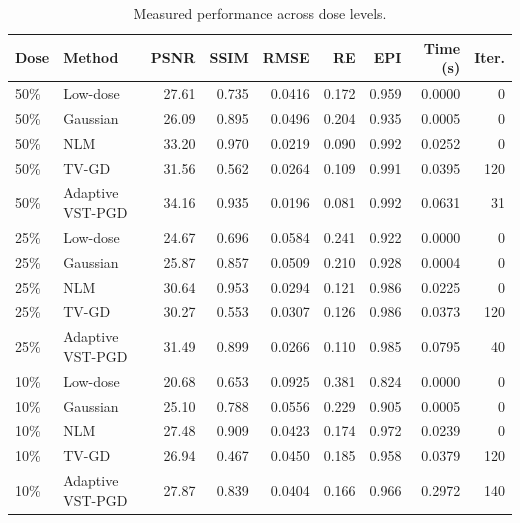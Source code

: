 \begin{table}[tbp]
\centering
\caption{Measured performance across dose levels.}
\label{tab:metrics}
\setlength{\tabcolsep}{3pt}
\begin{tabular}{@{}llrrrrrrr@{}}\toprule
Dose & Method & PSNR & SSIM & RMSE & RE & EPI & Time (s) & Iter.\\ \midrule
50\% & Low-dose & 27.61 & 0.735 & 0.0416 & 0.172 & 0.959 & 0.0000 & 0 \\
50\% & Gaussian & 26.09 & 0.895 & 0.0496 & 0.204 & 0.935 & 0.0005 & 0 \\
50\% & NLM & 33.20 & 0.970 & 0.0219 & 0.090 & 0.992 & 0.0252 & 0 \\
50\% & TV-GD & 31.56 & 0.562 & 0.0264 & 0.109 & 0.991 & 0.0395 & 120 \\
50\% & Adaptive VST-PGD & 34.16 & 0.935 & 0.0196 & 0.081 & 0.992 & 0.0631 & 31 \\
25\% & Low-dose & 24.67 & 0.696 & 0.0584 & 0.241 & 0.922 & 0.0000 & 0 \\
25\% & Gaussian & 25.87 & 0.857 & 0.0509 & 0.210 & 0.928 & 0.0004 & 0 \\
25\% & NLM & 30.64 & 0.953 & 0.0294 & 0.121 & 0.986 & 0.0225 & 0 \\
25\% & TV-GD & 30.27 & 0.553 & 0.0307 & 0.126 & 0.986 & 0.0373 & 120 \\
25\% & Adaptive VST-PGD & 31.49 & 0.899 & 0.0266 & 0.110 & 0.985 & 0.0795 & 40 \\
10\% & Low-dose & 20.68 & 0.653 & 0.0925 & 0.381 & 0.824 & 0.0000 & 0 \\
10\% & Gaussian & 25.10 & 0.788 & 0.0556 & 0.229 & 0.905 & 0.0005 & 0 \\
10\% & NLM & 27.48 & 0.909 & 0.0423 & 0.174 & 0.972 & 0.0239 & 0 \\
10\% & TV-GD & 26.94 & 0.467 & 0.0450 & 0.185 & 0.958 & 0.0379 & 120 \\
10\% & Adaptive VST-PGD & 27.87 & 0.839 & 0.0404 & 0.166 & 0.966 & 0.2972 & 140 \\
\bottomrule\end{tabular}
\end{table}